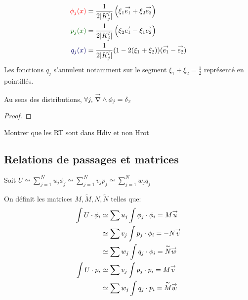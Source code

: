 \begin{minipage}{0.45\textwidth}
\begin{align*}
	\color{red}{\phi_j(x)} &= \frac{1}{2|K_j^l|}\left(\xi_1 \vect{e_1} + \xi_2 \vect{e_2}\right)\\
	\color{black!60!green}{p_j(x)} &= \frac{1}{2|K_j^l|}\left(\xi_2 \vect{e_1} -\xi_1 \vect{e_2}\right)\\
	\color{black!60!blue}{q_j(x)} &= \frac{1}{2|K_j^l|}(1-2(\xi_1+\xi_2))(\vect{e_1} -\vect{e_2})
\end{align*}
Les fonctions \(q_j\) s'annulent notamment sur le segment \(\xi_1+\xi_2=\frac{1}{2}\) représenté en pointillés. 
\end{minipage}
\begin{minipage}{0.53\textwidth}
	\centering
	\begin{tikzpicture}[scale=2.5]
	
	\end{tikzpicture}
\end{minipage}

\begin{prop}
Au sens des distributions, \(\forall j,\, \vrot \phi_j =
\delta_x\)
\end{prop}
\begin{proof}
\end{proof}

\begin{TODO}
  Montrer que les RT sont dans Hdiv et non Hrot
\end{TODO}

\subsection{Relations de passages et matrices}
Soit \( U \simeq \sum\limits_{j=1}^N u_j \phi_j \simeq \sum\limits_{j=1}^N v_j p_j \simeq \sum\limits_{j=1}^N w_j q_j\)

On définit les matrices \(M,\tilde M, N,\tilde N\) telles que:
\begin{align*}
  \int U \cdot \phi_i &\simeq \sum u_j \int \phi_j \cdot \phi_i = M\vect{u} \\
  & \simeq \sum v_j \int p_j \cdot \phi_i = -N\vect{v}\\
  & \simeq \sum w_j \int q_j \cdot \phi_i = \tilde{N}\vect{w} \\
  \int U \cdot p_i &\simeq \sum v_j \int p_j \cdot p_i = M\vect{v} \\
  &\simeq \sum w_j \int q_j \cdot p_i = \tilde M\vect{w}
\end{align*}
